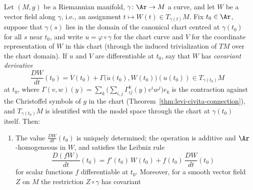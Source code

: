\begin{lemma}
\label{lem:cov-deriv-along-curve}
\leanok
{}
Let $(M,g)$ be a Riemannian manifold, $\gamma\colon\Ar\to M$ a curve, and
let $W$ be a vector field along $\gamma$, i.e., an assignment $t\mapsto
W(t)\in T_{\gamma(t)}M$. Fix $t_0\in\Ar$, suppose that $\gamma(s)$ lies in
the domain of the canonical chart centred at $\gamma(t_0)$ for all $s$ near
$t_0$, and write $u=\varphi\circ\gamma$ for the chart curve and $V$ for the
coordinate representation of $W$ in this chart (through the induced
trivialization of $TM$ over the chart domain). If $u$ and $V$ are
differentiable at $t_0$, say that $W$ has \emph{covariant derivative}
$$\frac{DW}{dt}(t_0)
=\dot V(t_0)+\Gamma\bigl(\dot u(t_0),W(t_0)\bigr)(u(t_0))
\in T_{\gamma(t_0)}M$$
at $t_0$, where $\Gamma(v,w)(y)=\sum_k\bigl(\sum_{i,j}
\Gamma^k_{ij}(y)v^iw^j\bigr)e_k$ is the contraction against the Christoffel
symbols of $g$ in the chart (Theorem~\ref{thm:levi-civita-connection}), and
$T_{\gamma(t_0)}M$ is identified with the model space through the chart at
$\gamma(t_0)$ itself. Then:
\begin{enumerate}
\item The value $\frac{DW}{dt}(t_0)$ is uniquely determined; the operation
is additive and $\Ar$-homogeneous in $W$, and satisfies the Leibniz rule
$$\frac{D(fW)}{dt}(t_0)=f'(t_0)\,W(t_0)+f(t_0)\,\frac{DW}{dt}(t_0)$$
for scalar functions $f$ differentiable at $t_0$. Moreover, for a smooth
vector field $Z$ on $M$ the restriction $Z\circ\gamma$ has covariant

\end{enumerate}
\end{lemma}

